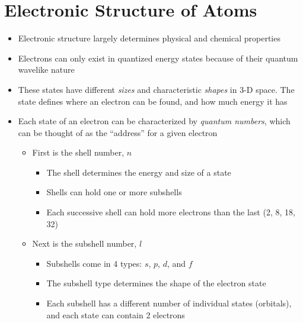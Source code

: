 \documentclass[12pt, openany, letterpaper]{memoir}
\begin{document}
\section{Electronic Structure of Atoms}
\begin{itemize}
	\item Electronic structure largely determines physical and chemical properties
	\item Electrons can only exist in quantized energy states because of their quantum wavelike nature
	\item These states have different \emph{sizes} and characteristic \emph{shapes} in 3-D space. The state defines where an electron can be found, and how much energy it has
	\item Each state of an electron can be characterized by \emph{quantum numbers}, which can be thought of as the ``address'' for a given electron
	      \begin{itemize}
		      \item First is the shell number, $n$
		            \begin{itemize}
			            \item The shell determines the energy and size of a state
			            \item Shells can hold one or more subshells
			            \item Each successive shell can hold more electrons than the last (2, 8, 18, 32)
		            \end{itemize}
		      \item  Next is the subshell number, $l$
		            \begin{itemize}
			            \item Subshells come in 4 types: $s$, $p$, $d$, and $f$
			            \item The subshell type determines the shape of the electron state
			            \item Each subshell has a different number of individual states (orbitals), and each state can contain 2 electrons


\end{itemize}
\end{itemize}
\end{itemize}
\end{document}
